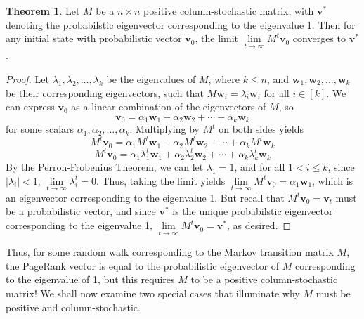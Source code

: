 \documentclass[11pt]{article}
\theoremstyle{definition}
\newtheorem{theorem}{Theorem}
\newcommand{\abs}[1]{\left| #1\right|}
\renewcommand{\vec}[1]{\mathbf{#1}}
\begin{document}

\begin{theorem}
    Let $M$ be a $n\times n$ positive column-stochastic matrix, with $\vec{v}^*$ denoting the probabilstic eigenvector corresponding to the eigenvalue 1.
    Then for any initial state with probabilistic vector $\vec{v}_0$, the limit $\lim\limits_{t\to \infty}{M^t \vec{v}_0}$ converges to $\vec{v}^*$.    
\end{theorem}
\begin{proof}
    Let $\lambda_1, \lambda_2, \ldots, \lambda_k$ be the eigenvalues of $M$, where $k \leq n$, and $\vec{w}_1, \vec{w}_2, \ldots, \vec{w}_k$ be their corresponding eigenvectors, 
    such that $M \vec{w}_i = \lambda_i \vec{w}_i$ for all $i \in [k]$.
    We can express $\vec{v}_0$ as a linear combination of the eigenvectors of $M$, so
    $$\vec{v}_0 = \alpha_1 \vec{w}_1 + \alpha_2 \vec{w}_2 + \cdots + \alpha_k \vec{w}_k$$
    for some scalars $\alpha_1, \alpha_2, \ldots, \alpha_k$. Multiplying by $M^t$ on both sides yields
    $$M^t \vec{v}_0 = \alpha_1 M^t \vec{w}_1 + \alpha_2 M^t \vec{w}_2 + \cdots + \alpha_k M^t \vec{w}_k$$
    $$M^t \vec{v}_0 = \alpha_1 \lambda_1^t \vec{w}_1 + \alpha_2 \lambda_2^t \vec{w}_2 + \cdots + \alpha_k \lambda_k^t \vec{w}_k$$
    By the Perron-Frobenius Theorem, we can let $\lambda_1 = 1$,
    and for all $1 < i \leq k$, since $\abs{\lambda_i} < 1$, $\lim\limits_{t\to \infty}{\lambda_i^t} = 0$.
    Thus, taking the limit yields $\lim\limits_{t\to \infty}{M^t \vec{v}_0} = \alpha_1 \vec{w}_1$, which is an eigenvector corresponding to the eigenvalue 1.
    But recall that $M^t \vec{v}_0 = \vec{v}_t$ must be a probabilistic vector,
    and since $\vec{v}^*$ is the unique probabilstic eigenvector corresponding to the eigenvalue 1, $\lim\limits_{t\to \infty}{M^t \vec{v}_0} = \vec{v}^*$, as desired.
\end{proof}

Thus, for some random walk corresponding to the Markov transition matrix $M$, 
the PageRank vector is equal to the probabilistic eigenvector of $M$ corresponding to the eigenvalue of 1, but this requires $M$ to be a positive column-stochastic matrix!
We shall now examine two special cases that illuminate why $M$ must be positive and column-stochastic.
\end{document}
